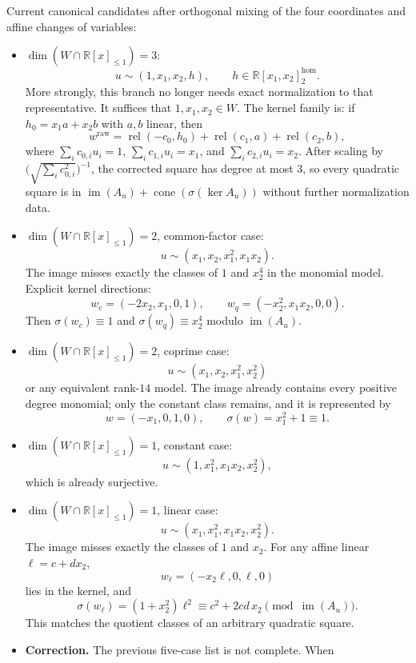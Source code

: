 \documentclass[11pt]{article}
\begin{document}
Current canonical candidates after orthogonal mixing of the four coordinates and
affine changes of variables:
\begin{itemize}
\item $\dim(W \cap \mathbb{R}[x]_{\le 1}) = 3$:
  \[
    u \sim (1, x_1, x_2, h), \qquad h \in \mathbb{R}[x_1,x_2]_2^{\mathrm{hom}}.
  \]
  More strongly, this branch no longer needs exact normalization to that
  representative. It suffices that $1,x_1,x_2 \in W$. The kernel family is:
  if $h_0 = x_1 a + x_2 b$ with $a,b$ linear, then
  \[
    w^{\mathrm{raw}}
    =
    \operatorname{rel}(-c_0,h_0)+\operatorname{rel}(c_1,a)+\operatorname{rel}(c_2,b),
  \]
  where $\sum_i c_{0,i}u_i = 1$, $\sum_i c_{1,i}u_i = x_1$, and
  $\sum_i c_{2,i}u_i = x_2$. After scaling by
  $\bigl(\sqrt{\sum_i c_{0,i}^2}\bigr)^{-1}$, the corrected square has degree
  at most $3$, so every quadratic square is in
  $\operatorname{im}(A_u)+\operatorname{cone}(\sigma(\ker A_u))$ without
  further normalization data.
\item $\dim(W \cap \mathbb{R}[x]_{\le 1}) = 2$, common-factor case:
  \[
    u \sim (x_1, x_2, x_1^2, x_1 x_2).
  \]
  The image misses exactly the classes of $1$ and $x_2^4$ in the monomial
  model. Explicit kernel directions:
  \[
    w_c = (-2x_2, x_1, 0, 1), \qquad
    w_q = (-x_2^2, x_1 x_2, 0, 0).
  \]
  Then $\sigma(w_c) \equiv 1$ and $\sigma(w_q) \equiv x_2^4$ modulo
  $\operatorname{im}(A_u)$.
\item $\dim(W \cap \mathbb{R}[x]_{\le 1}) = 2$, coprime case:
  \[
    u \sim (x_1, x_2, x_1^2, x_2^2)
  \]
  or any equivalent rank-$14$ model. The image already contains every positive
  degree monomial; only the constant class remains, and it is represented by
  \[
    w = (-x_1, 0, 1, 0), \qquad \sigma(w)=x_1^2+1 \equiv 1.
  \]
\item $\dim(W \cap \mathbb{R}[x]_{\le 1}) = 1$, constant case:
  \[
    u \sim (1, x_1^2, x_1 x_2, x_2^2),
  \]
  which is already surjective.
\item $\dim(W \cap \mathbb{R}[x]_{\le 1}) = 1$, linear case:
  \[
    u \sim (x_1, x_1^2, x_1 x_2, x_2^2).
  \]
  The image misses exactly the classes of $1$ and $x_2$. For any affine linear
  $\ell = c + d x_2$,
  \[
    w_\ell = (-x_2 \ell, 0, \ell, 0)
  \]
  lies in the kernel, and
  \[
    \sigma(w_\ell) = (1+x_2^2)\ell^2 \equiv c^2 + 2 c d\, x_2
    \pmod{\operatorname{im}(A_u)}.
  \]
  This matches the quotient classes of an arbitrary quadratic square.
\item \textbf{Correction.} The previous five-case list is not complete. When

\end{itemize}
\end{document}

